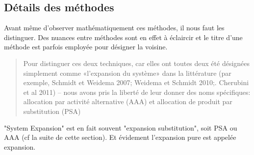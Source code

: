 \subsection{Détails des méthodes}
\label{subsec:Détails des méthodes}
%
%
%
%

Avant même d'observer mathématiquement ces méthodes, il nous faut les distinguer.
Des nuances entre méthodes sont en effet à éclaircir et le titre d'une méthode est parfois employée pour désigner la voisine.
\blockcquote[traduction]{majeau-bettez_unified_2014}{
Pour distinguer ces deux techniques, car elles ont toutes deux été désignées simplement comme «l'expansion du système» dans la littérature (par exemple, Schmidt et Weidema 2007; Weidema et Schmidt 2010;. Cherubini et al 2011) -- nous avons pris la liberté de leur donner des noms spécifiques: allocation par activité alternative (AAA) et allocation de produit par substitution (PSA)
}
"System Expansion" est en fait souvent "expansion substitution", soit PSA ou AAA (cf la suite de cette section).
Et évidement l'expansion pure est appelée expansion.


